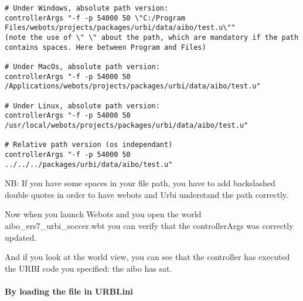 \begin{lstlisting}
# Under Windows, absolute path version:
controllerArgs "-f -p 54000 50 \"C:/Program Files/webots/projects/packages/urbi/data/aibo/test.u\""
(note the use of \" \" about the path, which are mandatory if the path
contains spaces. Here between Program and Files)

# Under MacOs, absolute path version:
controllerArgs "-f -p 54000 50 /Applications/webots/projects/packages/urbi/data/aibo/test.u"

# Under Linux, absolute path version:
controllerArgs "-f -p 54000 50 /usr/local/webots/projects/packages/urbi/data/aibo/test.u"

# Relative path version (os independant)
controllerArgs "-f -p 54000 50 ../../../packages/urbi/data/aibo/test.u"
\end{lstlisting}

NB: If you have some spaces in your file path, you have to add
backslashed double quotes in order to have webots and Urbi understand
the path correctly.


Now when you launch Webots and you open the world
aibo\_ers7\_urbi\_soccer.wbt you can verify that the controllerArgs
was correctly updated.




And if you look at the world view, you can see that the controller has
executed the URBI code you specified: the aibo has sat.




\paragraph{By loading the file in URBI.ini}
\label{webots.firstrun.loadprograms.inURBIinifile}%

